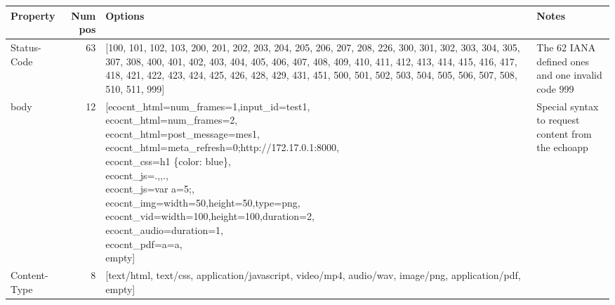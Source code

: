 \begin{tabular}{lrp{9cm}p{4cm}}
\toprule
                    Property &  Num pos &                                                                                                                                                                                                                                                                                                                                                    Options &                                                                              Notes \\
\midrule
                 Status-Code &       63 &                                \parbox[t]{9cm}{[100, 101, 102, 103, 200, 201, 202, 203, 204, 205, 206, 207, 208, 226, 300, 301, 302, 303, 304, 305, 307, 308, 400, 401, 402, 403, 404, 405, 406, 407, 408, 409, 410, 411, 412, 413, 414, 415, 416, 417, 418, 421, 422, 423, 424, 425, 426, 428, 429, 431, 451, 500, 501, 502, 503, 504, 505, 506, 507, 508, 510, 511, 999]} & The 62 IANA defined ones \cite{HypertextTransferProtocol} and one invalid code 999 \\
                        body &       12 & \parbox[t]{9cm}{[ecocnt\_html=num\_frames=1,input\_id=test1,\\ ecocnt\_html=num\_frames=2,\\ ecocnt\_html=post\_message=mes1,\\ ecocnt\_html=meta\_refresh=0;http://172.17.0.1:8000,\\ ecocnt\_css=h1 \{color: blue\},\\ ecocnt\_js=.,,.,\\ ecocnt\_js=var a=5;,\\ ecocnt\_img=width=50,height=50,type=png,\\ ecocnt\_vid=width=100,height=100,duration=2,\\ ecocnt\_audio=duration=1,\\ ecocnt\_pdf=a=a,\\ empty]} & Special syntax to request content from the \gls{echoapp}                                                                              \\                
                        Content-Type &        8 &                                                                                                                                                                                                                                                     [text/html, text/css, application/javascript, video/mp4, audio/wav, image/png, application/pdf, empty] &                                                                                    \\         

\end{tabular}

